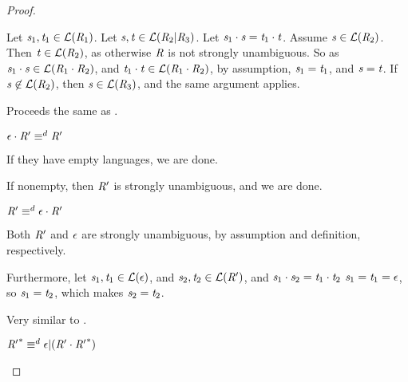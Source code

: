 \documentclass[numbers,10pt,preprint\ifanon ,nocopyrightspace\fi]{sigplanconf}
\begin{document}
\begin{proof}
\begin{case}
    Let $\mathit{s}_1,\mathit{t}_1 \in \mathcal{L}(\mathit{R}_1)$.
    Let $\mathit{s},\mathit{t} \in \mathcal{L}(\mathit{R}_2 | \mathit{R}_3)$.
    Let $\mathit{s}_1 \cdot \mathit{s} = \mathit{t}_1 \cdot \mathit{t}$.
    Assume $\mathit{s} \in \mathcal{L}(\mathit{R}_2)$.  Then $\mathit{t} \in
    \mathcal{L}(\mathit{R}_2)$, as otherwise $\mathit{R}$ is not strongly unambiguous.
    So as $\mathit{s}_1 \cdot \mathit{s} \in \mathcal{L}(\mathit{R}_1 \cdot
      \mathit{R}_2)$,
    and $\mathit{t}_1 \cdot \mathit{t} \in \mathcal{L}(\mathit{R}_1 \cdot
      \mathit{R}_2)$, by assumption, $\mathit{s}_1 = \mathit{t}_1$, and $\mathit{s} =
    \mathit{t}$.
    If $\mathit{s} \not\in \mathcal{L}(\mathit{R}_2)$, then $\mathit{s} \in
    \mathcal{L}(\mathit{R}_3)$, and the same argument applies.
  \end{case}

  \begin{case}
    Proceeds the same as \DistributivityLeftRule{}.
  \end{case}

  \begin{case}
    $\epsilon \cdot \mathit{R}' \equiv^d \mathit{R}'$

    If they have empty languages, we are done.

    If nonempty, then $\mathit{R}'$ is strongly unambiguous, and we are done.
  \end{case}

  \begin{case}
    $\mathit{R}' \equiv^d \epsilon \cdot \mathit{R}'$

    Both $\mathit{R}'$ and $\epsilon$ are strongly unambiguous, by assumption
    and definition, respectively.

    Furthermore, let $\mathit{s}_1,\mathit{t}_1 \in \mathcal{L}(\epsilon)$, and
    $\mathit{s}_2,\mathit{t}_2 \in \mathcal{L}(\mathit{R}')$, and $\mathit{s}_1 \cdot
    \mathit{s}_2 = \mathit{t}_1 \cdot \mathit{t}_2$
    $\mathit{s}_1 = \mathit{t}_1 = \epsilon$, so $\mathit{s}_1 = \mathit{t}_2$,
    which makes $\mathit{s}_2 = \mathit{t}_2$.
  \end{case}

  \begin{case}
    Very similar to \ConcatIdentityLeftRule{}.
  \end{case}

  \begin{case}
    ${\mathit{R}'}^* \equiv^d \epsilon | (\mathit{R}' \cdot
    {\ensuremath{\mathit{R}}'}^*)$


\end{case}
\end{proof}
\end{document}
